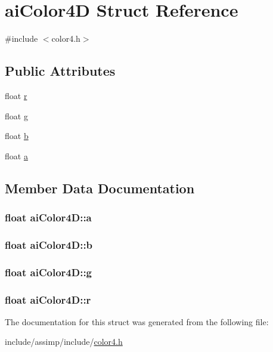 \hypertarget{structai_color4_d}{\section{ai\-Color4\-D Struct Reference}
\label{structai_color4_d}
}


{\ttfamily \#include $<$color4.\-h$>$}

\subsection*{Public Attributes}
\begin{DoxyCompactItemize}
\item 
float \hyperlink{structai_color4_d_a989c2117cfae5a4457fa65f0257e93c7}{r}
\item 
float \hyperlink{structai_color4_d_a32e929c7db12fb6f79f74a611f6d8fe6}{g}
\item 
float \hyperlink{structai_color4_d_ab64376fc730371f8952f5f98084b2430}{b}
\item 
float \hyperlink{structai_color4_d_a1bf4f719c14e844dcd7ce5a1c1969c89}{a}
\end{DoxyCompactItemize}


\subsection{Member Data Documentation}
\hypertarget{structai_color4_d_a1bf4f719c14e844dcd7ce5a1c1969c89}{
\subsubsection[{a}]{\setlength{\rightskip}{0pt plus 5cm}float ai\-Color4\-D\-::a}}\label{structai_color4_d_a1bf4f719c14e844dcd7ce5a1c1969c89}
\hypertarget{structai_color4_d_ab64376fc730371f8952f5f98084b2430}{
\subsubsection[{b}]{\setlength{\rightskip}{0pt plus 5cm}float ai\-Color4\-D\-::b}}\label{structai_color4_d_ab64376fc730371f8952f5f98084b2430}
\hypertarget{structai_color4_d_a32e929c7db12fb6f79f74a611f6d8fe6}{
\subsubsection[{g}]{\setlength{\rightskip}{0pt plus 5cm}float ai\-Color4\-D\-::g}}\label{structai_color4_d_a32e929c7db12fb6f79f74a611f6d8fe6}
\hypertarget{structai_color4_d_a989c2117cfae5a4457fa65f0257e93c7}{
\subsubsection[{r}]{\setlength{\rightskip}{0pt plus 5cm}float ai\-Color4\-D\-::r}}\label{structai_color4_d_a989c2117cfae5a4457fa65f0257e93c7}


The documentation for this struct was generated from the following file\-:\begin{DoxyCompactItemize}
\item 
include/assimp/include/\hyperlink{color4_8h}{color4.\-h}\end{DoxyCompactItemize}
